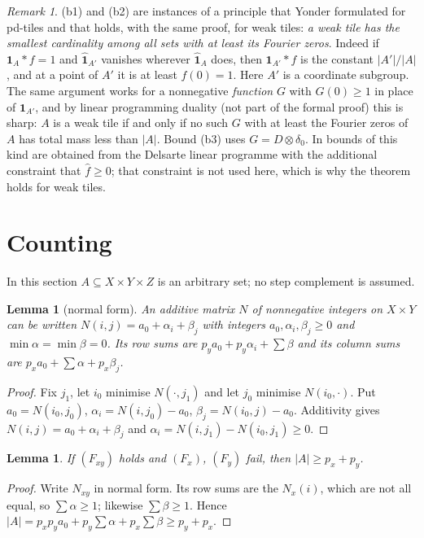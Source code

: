 \documentclass[11pt,a4paper]{amsart}
\newtheorem{lemma}[theorem]{Lemma}
\theoremstyle{definition}
\theoremstyle{remark}
\newtheorem{remark}[theorem]{Remark}
\newcommand{\one}{\mathbf{1}}
\begin{document}
\begin{remark}\label{rem:dual}
(b1) and (b2) are instances of a principle that Yonder formulated for pd-tiles and that holds, with the same
proof, for weak tiles: \emph{a weak tile has the smallest cardinality among all sets with at least its Fourier
zeros}. Indeed if $\one_A*f=1$ and $\hat{\one}_{A'}$ vanishes wherever
$\hat{\one}_A$ does, then $\one_{A'}*f$ is the constant $|A'|/|A|$, and at a point of $A'$ it is at least
$f(0)=1$. Here $A'$ is a coordinate subgroup. The same argument works for a nonnegative \emph{function} $G$ with
$G(0)\ge1$ in place of $\one_{A'}$, and by linear programming duality (not part of the formal proof) this is
sharp: $A$ is a weak tile if and
only if no such $G$ with at least the Fourier zeros of $A$ has total mass less than $|A|$. Bound (b3) uses
$G=D\otimes\delta_0$. In \cite{KLMS,KF} bounds of this kind are obtained from the Delsarte linear programme with
the additional constraint that $\hat f\ge 0$; that constraint is not used here, which is why the theorem holds
for weak tiles.
\end{remark}

\section{Counting}\label{sec:count}

In this section $A\subseteq X\times Y\times Z$ is an arbitrary set; no step complement is assumed.

\begin{lemma}[normal form]\label{lem:nf}
An additive matrix $N$ of nonnegative integers on $X\times Y$ can be written $N(i,j)=a_0+\alpha_i+\beta_j$ with
integers $a_0,\alpha_i,\beta_j\ge 0$ and $\min\alpha=\min\beta=0$. Its row sums are
$p_ya_0+p_y\alpha_i+\sum\beta$ and its column sums are $p_xa_0+\sum\alpha+p_x\beta_j$.
\end{lemma}
\begin{proof}
Fix $j_1$, let $i_0$ minimise $N(\cdot,j_1)$ and let $j_0$ minimise $N(i_0,\cdot)$. Put $a_0=N(i_0,j_0)$,
$\alpha_i=N(i,j_0)-a_0$, $\beta_j=N(i_0,j)-a_0$. Additivity gives $N(i,j)=a_0+\alpha_i+\beta_j$ and
$\alpha_i=N(i,j_1)-N(i_0,j_1)\ge 0$.
\end{proof}

\begin{lemma}\label{lem:three}
If $(F_{xy})$ holds and $(F_x)$, $(F_y)$ fail, then $|A|\ge p_x+p_y$.
\end{lemma}
\begin{proof}
Write $N_{xy}$ in normal form. Its row sums are the $N_x(i)$, which are not all equal, so $\sum\alpha\ge 1$;
likewise $\sum\beta\ge1$. Hence $|A|=p_xp_ya_0+p_y\sum\alpha+p_x\sum\beta\ge p_y+p_x$.
\end{proof}
\end{document}
